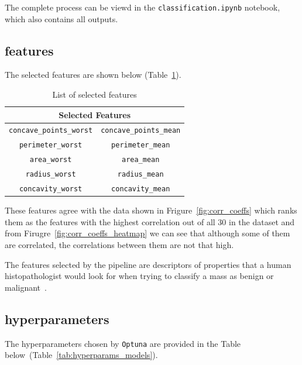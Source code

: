 \documentclass[12pt]{article}
\begin{document}
The complete process can be viewd in the \texttt{classification.ipynb} notebook,
which also contains all outputs.

\subsection{features}

The selected features are shown below
(Table~\ref{tab:features}).
\begin{table}[H]
    \centering
    \begin{tabular}{|c|c|}
    \hline
    \multicolumn{2}{|c|}{\textbf{Selected Features}} \\
    \hline
    \texttt{concave\_points\_worst} & \texttt{concave\_points\_mean} \\
    \hline
    \texttt{perimeter\_worst}       & \texttt{perimeter\_mean} \\
    \hline
    \texttt{area\_worst}            & \texttt{area\_mean} \\
    \hline
    \texttt{radius\_worst}          & \texttt{radius\_mean} \\
    \hline
    \texttt{concavity\_worst}       & \texttt{concavity\_mean} \\
    \hline
    \end{tabular}
    \caption{List of selected features}
    \label{tab:features}
\end{table}

These features agree with the data shown in Frigure~\ref{fig:corr_coeffs} which
ranks them as the features with the highest correlation out of all 30 in the
dataset and from Firugre~\ref{fig:corr_coeffs_heatmap} we can see that although
some of them are correlated, the correlations between them are not that high.

The features selected by the pipeline are descriptors of properties that a human
histopathologist would look for when trying to classify a mass as benign or
malignant~\cite{Weigelt_2010}.


\subsection{hyperparameters}

The hyperparameters chosen by \texttt{Optuna} are provided in the Table below\
(Table~\ref{tab:hyperparams_models}).
\end{document}
